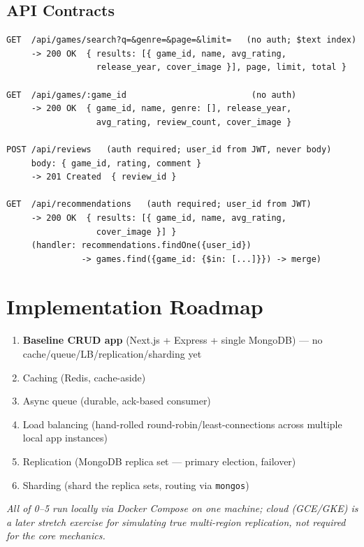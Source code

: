 \documentclass[11pt]{article}
\begin{document}
\subsection{API Contracts}

\begin{lstlisting}
GET  /api/games/search?q=&genre=&page=&limit=   (no auth; $text index)
     -> 200 OK  { results: [{ game_id, name, avg_rating,
                  release_year, cover_image }], page, limit, total }

GET  /api/games/:game_id                         (no auth)
     -> 200 OK  { game_id, name, genre: [], release_year,
                  avg_rating, review_count, cover_image }

POST /api/reviews   (auth required; user_id from JWT, never body)
     body: { game_id, rating, comment }
     -> 201 Created  { review_id }

GET  /api/recommendations   (auth required; user_id from JWT)
     -> 200 OK  { results: [{ game_id, name, avg_rating,
                  cover_image }] }
     (handler: recommendations.findOne({user_id})
               -> games.find({game_id: {$in: [...]}}) -> merge)
\end{lstlisting}

\section{Implementation Roadmap}

\begin{enumerate}[nosep]
    \item[0.] \textbf{Baseline CRUD app} (Next.js + Express + single MongoDB) --- no cache/queue/LB/replication/sharding yet
    \item Caching (Redis, cache-aside)
    \item Async queue (durable, ack-based consumer)
    \item Load balancing (hand-rolled round-robin/least-connections across multiple local app instances)
    \item Replication (MongoDB replica set --- primary election, failover)
    \item Sharding (shard the replica sets, routing via \texttt{mongos})
\end{enumerate}

\textit{All of 0--5 run locally via Docker Compose on one machine; cloud (GCE/GKE) is a later stretch exercise for simulating true multi-region replication, not required for the core mechanics.}
\end{document}
